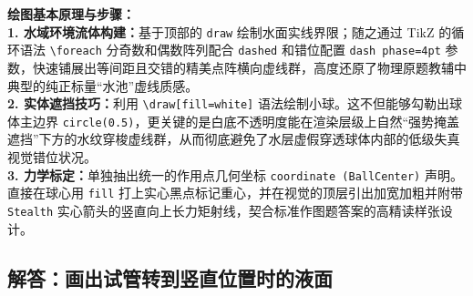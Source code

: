 \vspace{0.6cm}

{\small\color{blue!70!black}
\textbf{绘图基本原理与步骤：}\\
\textbf{1. 水域环境流体构建：}基于顶部的 \texttt{draw} 绘制水面实线界限；随之通过 TikZ 的循环语法 \texttt{\textbackslash foreach} 分奇数和偶数阵列配合 \texttt{dashed} 和错位配置 \texttt{dash phase=4pt} 参数，快速铺展出等间距且交错的精美点阵横向虚线群，高度还原了物理原题教辅中典型的纯正标量“水池”虚线质感。\\
\textbf{2. 实体遮挡技巧：}利用 \texttt{\textbackslash draw[fill=white]} 语法绘制小球。这不但能够勾勒出球体主边界 \texttt{circle(0.5)}，更关键的是白底不透明度能在渲染层级上自然“强势掩盖遮挡”下方的水纹穿梭虚线群，从而彻底避免了水层虚假穿透球体内部的低级失真视觉错位状况。\\
\textbf{3. 力学标定：}单独抽出统一的作用点几何坐标 \texttt{coordinate (BallCenter)} 声明。直接在球心用 \texttt{fill} 打上实心黑点标记重心，并在视觉的顶层引出加宽加粗并附带 \texttt{Stealth} 实心箭头的竖直向上长力矩射线，契合标准作图题答案的高精读样张设计。
}

\vspace{1.0cm}


\newpage

\subsection{解答：画出试管转到竖直位置时的液面}

\vspace{0.6cm}

